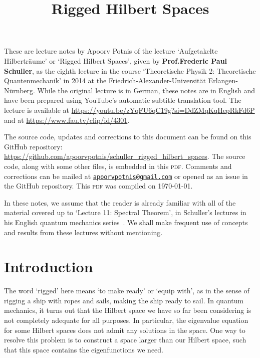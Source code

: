 \documentclass[11pt, a4paper]{article}
\title{Rigged Hilbert Spaces}
\author{}
\date{\vspace{-5ex}}
\theoremstyle{definition}
\begin{document}
    \maketitle

    These are lecture notes by Apoorv Potnis of the lecture `Aufgetakelte Hilberträume' or `Rigged Hilbert Spaces', given by \textbf{Prof.\@ Frederic Paul Schuller}, as the eighth lecture in the course `Theoretische Physik 2: Theoretische Quantenmechanik' in 2014 at the Friedrich-Alexander-Universität Erlangen-Nürnberg. While the original lecture is in German, these notes are in English and have been prepared using YouTube's automatic subtitle translation tool. The lecture is available at \url{https://youtu.be/zYqFU6qC19g?si=DdZMqKqHepRkFd6P} and at \url{https://www.fau.tv/clip/id/4301}.

    The source code, updates and corrections to this document can be found on this GitHub repository: \url{https://github.com/apoorvpotnis/schuller_rigged_hilbert_spaces}. The source code, along with some other files, is embedded in this \textsc{pdf}. Comments and corrections can be mailed at \href{mailto:apoorvpotnis@gmail.com}{\texttt{apoorvpotnis@gmail.com}} or opened as an issue in the GitHub repository. This \textsc{pdf} was compiled on \today.

    In these notes, we assume that the reader is already familiar with all of the material covered up to `Lecture 11: Spectral Theorem', in Schuller's lectures in his English quantum mechanics series~\cite{SchullerVideos, Schuller}. We shall make frequent use of concepts and results from these lectures without mentioning.

    \tableofcontents

    \section{Introduction}

    The word `rigged' here means `to make ready' or `equip with', as in the sense of rigging a ship with ropes and sails, making the ship ready to sail. In quantum mechanics, it turns out that the Hilbert space we have so far been considering is not completely adequate for all purposes. In particular, the eigenvalue equation for some Hilbert spaces does not admit any solutions in the space. One way to resolve this problem is to construct a space larger than our Hilbert space, such that this space contains the eigenfunctions we need.
\end{document}
